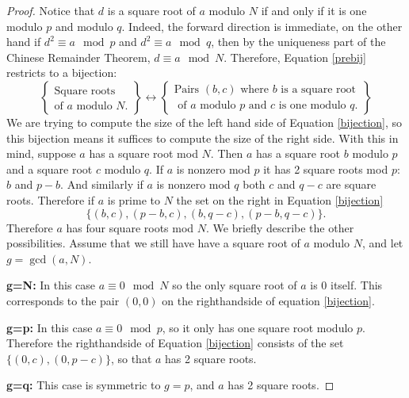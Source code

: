 \documentclass[11pt]{article}
\begin{document}
\begin{enumerate}
{\begin{enumerate}
\begin{proof}
      Notice that $d$ is a square root of $a$ modulo $N$ if and only if it is one modulo $p$ and modulo $q$.  Indeed, the forward direction is immediate, on the other hand if $d^2\equiv a\mod p$ and $d^2\equiv a\mod q$, then by the uniqueness part of the Chinese Remainder Theorem, $d\equiv a\mod N$.  Therefore, Equation \ref{prebij} restricts to a bijection:
      \begin{equation}\label{bijection}
        \left\{
        \begin{array}{c}
          \text{Square roots}\\
          \text{of }a\text{ modulo }N.
        \end{array}
        \right\}
        \leftrightarrow
        \left\{
        \begin{array}{c}
          \text{Pairs }(b,c)\text{ where }b\text{ is a square root}\\
          \text{ of }a\text{ modulo }p\text{ and }c\text{ is one modulo }q.
        \end{array}
        \right\}
      \end{equation}
      We are trying to compute the size of the left hand side of Equation \ref{bijection}, so this bijection means it suffices to compute the size of the right side.  With this in mind, suppose $a$ has a square root mod $N$.  Then $a$ has a square root $b$ modulo $p$ and a square root $c$ modulo $q$.  If $a$ is nonzero mod $p$ it has 2 square roots mod $p$: $b$ and $p-b$.  And similarly if $a$ is nonzero mod $q$ both $c$ and $q-c$ are square roots.  Therefore if $a$ is prime to $N$ the set on the right in Equation \ref{bijection}
      \[\{(b,c),(p-b,c),(b,q-c),(p-b,q-c)\}.\]
      Therefore $a$ has four square roots mod $N$.  We briefly describe the other possibilities.  Assume that we still have have a square root of $a$ modulo $N$, and let $g = \gcd(a,N)$.

      \textbf{g=N:} In this case $a\equiv0\mod N$ so the only square root of $a$ is 0 itself.  This corresponds to the pair $(0,0)$ on the righthandside of equation \ref{bijection}.

      \textbf{g=p:} In this case $a\equiv0\mod p$, so it only has one square root modulo $p$.  Therefore the righthandside of Equation \ref{bijection} consists of the set $\{(0,c),(0,p-c)\}$, so that $a$ has 2 square roots.

      \textbf{g=q:} This case is symmetric to $g=p$, and $a$ has 2 square roots.


\end{proof}
\end{enumerate}}
\end{enumerate}
\end{document}
